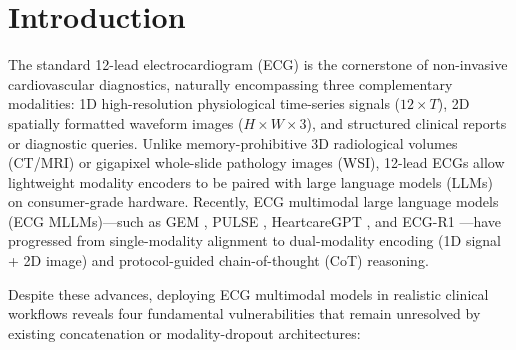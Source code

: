 \documentclass[preprint,12pt]{elsarticle}
\begin{document}
\section{Introduction}
The standard 12-lead electrocardiogram (ECG) is the cornerstone of non-invasive cardiovascular diagnostics, naturally encompassing three complementary modalities: 1D high-resolution physiological time-series signals ($12 \times T$), 2D spatially formatted waveform images ($H \times W \times 3$), and structured clinical reports or diagnostic queries. Unlike memory-prohibitive 3D radiological volumes (CT/MRI) or gigapixel whole-slide pathology images (WSI), 12-lead ECGs allow lightweight modality encoders to be paired with large language models (LLMs) on consumer-grade hardware. Recently, ECG multimodal large language models (ECG MLLMs)---such as GEM \cite{gem2025}, PULSE \cite{pulse2026}, HeartcareGPT \cite{heartcare2026}, and ECG-R1 \cite{ecgr1_2026}---have progressed from single-modality alignment to dual-modality encoding (1D signal + 2D image) and protocol-guided chain-of-thought (CoT) reasoning.

Despite these advances, deploying ECG multimodal models in realistic clinical workflows reveals four fundamental vulnerabilities that remain unresolved by existing concatenation or modality-dropout architectures:
\end{document}

